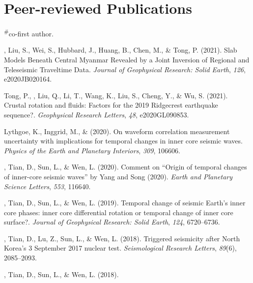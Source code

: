 \newcommand{\CS}{*} %
\newcommand{\CF}{\textsuperscript{\#}} %

\section*{Peer-reviewed Publications}
\CF co-first author.

\begin{etaremune}
\item
    \Yao, Liu, S., Wei, S., Hubbard, J., Huang, B., Chen, M., \& Tong, P. (2021).
    Slab Models Beneath Central Myanmar Revealed by a Joint Inversion of Regional and Teleseismic Traveltime Data.
    \textit{Journal of Geophysical Research: Solid Earth}, \textit{126}, e2020JB020164.
\item
    Tong, P., \Yao, Liu, Q., Li, T., Wang, K., Liu, S., Cheng, Y., \& Wu, S. (2021).
    Crustal rotation and fluids: Factors for the 2019 Ridgecrest earthquake sequence?.
    \textit{Geophysical Research Letters}, \textit{48}, e2020GL090853.
\item
    Lythgoe, K., Inggrid, M., \& \Yao (2020).
    On waveform correlation measurement uncertainty with implications for temporal changes in inner core seismic waves.
    \textit{Physics of the Earth and Planetary Interiors}, \textit{309}, 106606.
\item
    \Yao, Tian, D., Sun, L., \& Wen, L. (2020).
    Comment on “Origin of temporal changes of inner-core seismic waves” by Yang and Song (2020).
    \textit{Earth and Planetary Science Letters}, \textit{553}, 116640.
\item
    \Yao, Tian, D., Sun, L., \& Wen, L. (2019).
    Temporal change of seismic Earth’s inner core phases: inner core differential rotation or temporal change of inner core surface?.
    \textit{Journal of Geophysical Research: Solid Earth}, \textit{124}, 6720--6736.
\item
    \Yao, Tian, D., Lu, Z., Sun, L., \& Wen, L. (2018).
    Triggered seismicity after North Korea's 3 September 2017 nuclear test.
    \textit{Seismological Research Letters}, \textit{89}(6), 2085--2093.
\item
    \Yao, Tian, D., Sun, L., \& Wen, L. (2018).

\end{etaremune}
